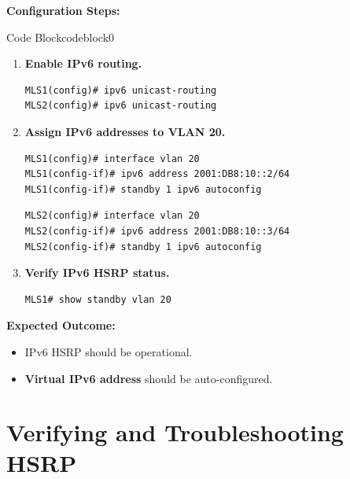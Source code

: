 \documentclass[a4paper]{book}
\begin{document}
\vspace{1.5em}

\textbf{Configuration Steps:}


\vspace{1.5em}


\begin{ocg}{Code Block}{codeblock}{0}

\vspace{0.5cm}
\begin{enumerate}
\item \textbf{Enable IPv6 routing.}
\begin{lstlisting}
MLS1(config)# ipv6 unicast-routing
MLS2(config)# ipv6 unicast-routing
\end{lstlisting}

\item \textbf{Assign IPv6 addresses to VLAN 20.}
\begin{lstlisting}
MLS1(config)# interface vlan 20
MLS1(config-if)# ipv6 address 2001:DB8:10::2/64
MLS1(config-if)# standby 1 ipv6 autoconfig
\end{lstlisting}
\begin{lstlisting}
MLS2(config)# interface vlan 20
MLS2(config-if)# ipv6 address 2001:DB8:10::3/64
MLS2(config-if)# standby 1 ipv6 autoconfig
\end{lstlisting}

\item \textbf{Verify IPv6 HSRP status.}
\begin{lstlisting}
MLS1# show standby vlan 20
\end{lstlisting}
\end{enumerate}
\end{ocg}




\textbf{Expected Outcome:}
\begin{itemize}
\item IPv6 HSRP should be operational.
\item \textbf{Virtual IPv6 address} should be auto-configured.
\end{itemize}


\vspace{1.5em}

\section{Verifying and Troubleshooting HSRP}
\end{document}
